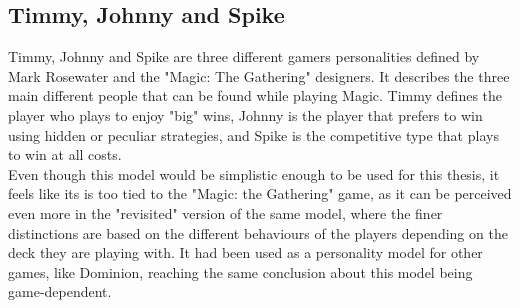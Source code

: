 \subsection{Timmy, Johnny and Spike}
Timmy, Johnny and Spike are three different gamers personalities defined by Mark Rosewater and the "Magic: The Gathering" designers. It describes the three main different people that can be found while playing Magic.
Timmy defines the player who plays to enjoy "big" wins, Johnny is the player that prefers to win using hidden or peculiar strategies, and Spike is the competitive type that plays to win at all costs\cite{rosewater2002timmy}.\\
Even though this model would be simplistic enough to be used for this thesis, it feels like its is too tied to the "Magic: the Gathering" game, as it can be perceived even more in the "revisited" version of the same model\cite{rosewater2006timmy}, where the finer distinctions are based on the different behaviours of the players depending on the deck they are playing with.
It had been used as a personality model for other games, like Dominion\cite{gold2011trigram}, reaching the same conclusion about this model being game-dependent.
